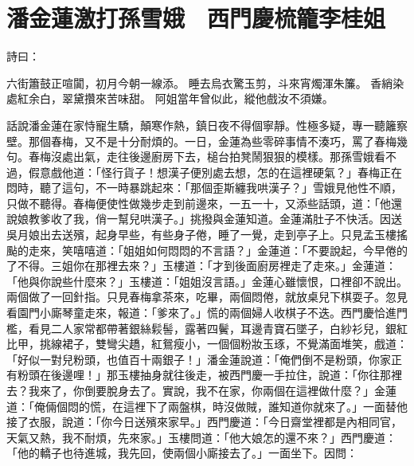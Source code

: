 %

\chapter{潘金蓮激打孫雪娥　西門慶梳籠李桂姐}

詩曰：

六街簫鼓正喧闐，初月今朝一線添。
睡去烏衣驚玉剪，斗來宵燭渾朱簾。
香綃染處紅余白，翠黛攢來苦味甜。
阿姐當年曾似此，縱他戲汝不須嫌。

話說潘金蓮在家恃寵生驕，顛寒作熱，鎮日夜不得個寧靜。性極多疑，專一聽籬察壁。那個春梅，又不是十分耐煩的。一日，金蓮為些零碎事情不湊巧，罵了春梅幾句。春梅沒處出氣，走往後邊廚房下去，槌台拍凳鬧狠狠的模樣。那孫雪娥看不過，假意戲他道：「怪行貨子！想漢子便別處去想，怎的在這裡硬氣？」春梅正在悶時，聽了這句，不一時暴跳起來：「那個歪斯纏我哄漢子？」雪娥見他性不順，只做不聽得。春梅便使性做幾步走到前邊來，一五一十，又添些話頭，道：「他還說娘教爹收了我，俏一幫兒哄漢子。」挑撥與金蓮知道。金蓮滿肚子不快活。因送吳月娘出去送殯，起身早些，有些身子倦，睡了一覺，走到亭子上。只見孟玉樓搖颭的走來，笑嘻嘻道：「姐姐如何悶悶的不言語？」金蓮道：「不要說起，今早倦的了不得。三姐你在那裡去來？」玉樓道：「才到後面廚房裡走了走來。」金蓮道： 「他與你說些什麼來？」玉樓道：「姐姐沒言語。」金蓮心雖懷恨，口裡卻不說出。兩個做了一回針指。只見春梅拿茶來，吃畢，兩個悶倦，就放桌兒下棋耍子。忽見看園門小廝琴童走來，報道：「爹來了。」慌的兩個婦人收棋子不迭。西門慶恰進門檻，看見二人家常都帶著銀絲鬏髻，露著四鬢，耳邊青寶石墜子，白紗衫兒，銀紅比甲，挑線裙子，雙彎尖趫，紅鴛瘦小，一個個粉妝玉琢，不覺滿面堆笑，戲道：「好似一對兒粉頭，也值百十兩銀子！」潘金蓮說道：「俺們倒不是粉頭，你家正有粉頭在後邊哩！」那玉樓抽身就往後走，被西門慶一手拉住，說道：「你往那裡去？我來了，你倒要脫身去了。實說，我不在家，你兩個在這裡做什麼？」金蓮道：「俺倆個悶的慌，在這裡下了兩盤棋，時沒做賊，誰知道你就來了。」一面替他接了衣服，說道：「你今日送殯來家早。」西門慶道：「今日齋堂裡都是內相同官，天氣又熱，我不耐煩，先來家。」玉樓問道：「他大娘怎的還不來？」西門慶道：「他的轎子也待進城，我先回，使兩個小廝接去了。」一面坐下。因問： 